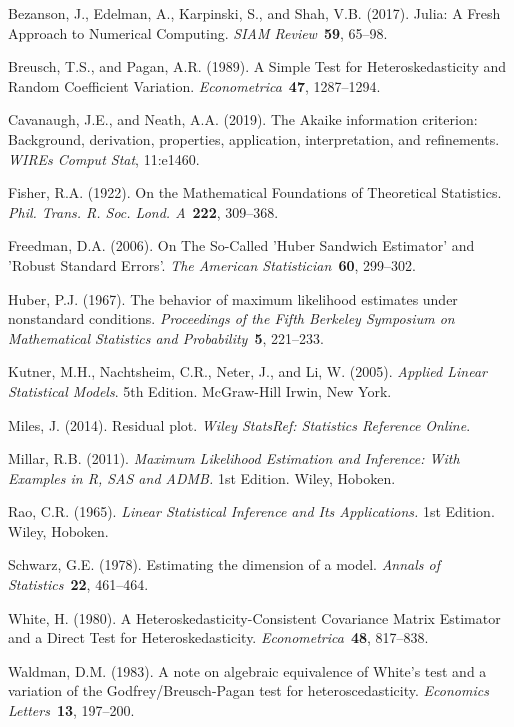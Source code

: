 \documentclass[12pt]{article} %
\theoremstyle{definition}
\begin{document}
\begin{thebibliography}{}

Bezanson, J., Edelman, A., Karpinski, S., and Shah, V.B. (2017).
 Julia: A Fresh Approach to Numerical Computing.
{\em SIAM Review}~{\bf 59}, 65--98.

Breusch, T.S., and Pagan, A.R. (1989).
 A Simple Test for Heteroskedasticity and Random Coefficient Variation.
{\em Econometrica}~{\bf 47}, 1287--1294.

Cavanaugh, J.E., and Neath, A.A. (2019).
 The Akaike information criterion: Background, derivation, properties, application, interpretation, and refinements.
{\em WIREs Comput Stat}, 11:e1460.

Fisher, R.A. (1922).
 On the Mathematical Foundations of Theoretical Statistics.
{\em Phil. Trans. R. Soc. Lond. A}~{\bf 222}, 309--368.

Freedman, D.A. (2006).
 On The So-Called 'Huber Sandwich Estimator' and 'Robust Standard Errors'.
{\em The American Statistician}~{\bf 60}, 299--302.

Huber, P.J. (1967).
 The behavior of maximum likelihood estimates under nonstandard conditions.
{\em Proceedings of the Fifth Berkeley Symposium on Mathematical Statistics and Probability}~{\bf 5}, 221--233.

Kutner, M.H., Nachtsheim, C.R., Neter, J., and Li, W. (2005).
 {\em Applied Linear Statistical Models}.
5th Edition. McGraw-Hill Irwin, New York.

Miles, J. (2014).
 Residual plot.
{\em Wiley StatsRef: Statistics Reference Online}.

Millar, R.B. (2011).
 {\em Maximum Likelihood Estimation and Inference: With Examples in R, SAS and ADMB.}
1st Edition. Wiley, Hoboken.

Rao, C.R. (1965).
 {\em Linear Statistical Inference and Its Applications.}
1st Edition. Wiley, Hoboken.

Schwarz, G.E. (1978).
 Estimating the dimension of a model.
{\em Annals of Statistics}~{\bf 22}, 461--464.

White, H. (1980).
 A Heteroskedasticity-Consistent Covariance Matrix Estimator and a Direct Test for Heteroskedasticity.
{\em Econometrica}~{\bf 48}, 817--838.

Waldman, D.M. (1983).
 A note on algebraic equivalence of White's test and a variation of the Godfrey/Breusch-Pagan test for heteroscedasticity.
{\em Economics Letters}~{\bf 13}, 197--200.



\end{thebibliography}
\end{document}
